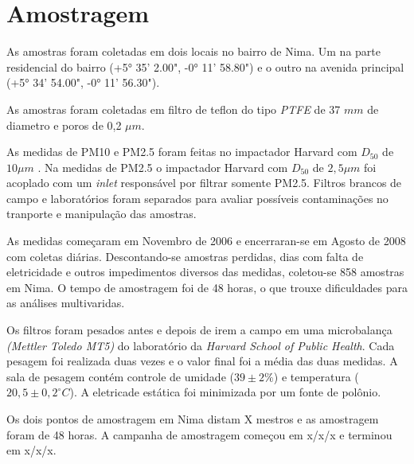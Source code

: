 \section{Amostragem}


As amostras foram coletadas em dois locais no bairro de Nima. 
Um na parte residencial do bairro (+5° 35' 2.00", -0° 11' 58.80") 
e o outro na avenida principal (+5° 34' 54.00", -0° 11' 56.30"). 

As amostras foram coletadas em filtro de teflon do tipo \textit{PTFE} de 
37 $mm$ de diametro  e poros de 0,2 $\mu m$.

As medidas de PM10 e PM2.5 foram feitas no impactador Harvard com $D_{50}$ 
de $10 \mu m$ \cite{marple1987}. 
Na medidas de PM2.5 o impactador Harvard com $D_{50}$ de $2,5 \mu m$ 
foi acoplado com um \textit{inlet} responsável por filtrar somente PM2.5.
Filtros brancos de campo e laboratórios foram separados para avaliar possíveis
contaminações no tranporte e manipulação das amostras. 

As medidas começaram em Novembro de 2006 e encerraran-se em Agosto de 2008
com coletas diárias. Descontando-se amostras perdidas, dias com falta
de eletricidade e outros impedimentos diversos das medidas, 
coletou-se 858 amostras em Nima.  
O tempo de amostragem foi de 48 horas, o que trouxe dificuldades para 
as análises multivaridas. 

Os filtros foram pesados antes e depois de irem a campo em uma microbalança  
\textit{(Mettler Toledo MT5)} do laboratório da 
\textit{Harvard School of Public Health}. Cada pesagem foi realizada duas vezes 
e o valor final foi a média das duas medidas.
A sala de pesagem contém controle de umidade ($39 \pm 2 \%$) e 
temperatura ($20,5 \pm 0,2 ^{\circ} C$). 
A eletricade estática foi minimizada por um fonte de polônio. 



Os dois pontos de amostragem em Nima distam X mestros e as amostragem foram de 48 horas.
A campanha de amostragem começou em x/x/x e terminou em x/x/x.


